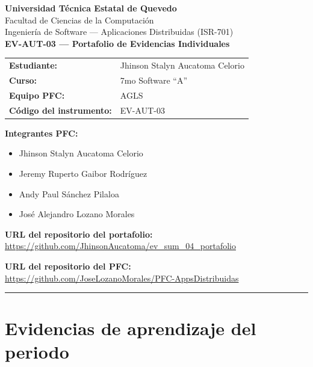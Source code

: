 \documentclass[11pt]{article}
\title{}
\date{}
\begin{document}
    \begin{center}
        {\large\bfseries Universidad Técnica Estatal de Quevedo}\\
        Facultad de Ciencias de la Computación\\
        Ingeniería de Software --- Aplicaciones Distribuidas (ISR-701)\\[1em]
        {\Large\bfseries EV-AUT-03 --- Portafolio de Evidencias Individuales}\\[1.5em]
    \end{center}
    \noindent
    \begin{tabular}{@{}ll}
        \textbf{Estudiante:} & Jhinson Stalyn Aucatoma Celorio \\
        \textbf{Curso:} & 7mo Software ``A'' \\
        \textbf{Equipo PFC:} & AGLS \\
        \textbf{Código del instrumento:} & EV-AUT-03 \\
    \end{tabular}

    \medskip
    \noindent\textbf{Integrantes PFC:}
    \begin{itemize}[noitemsep,topsep=2pt]
          \item Jhinson Stalyn Aucatoma Celorio
          \item Jeremy Ruperto Gaibor Rodríguez
          \item Andy Paul Sánchez Pilaloa
          \item José Alejandro Lozano Morales
    \end{itemize}

    \bigskip
    \noindent\textbf{URL del repositorio del portafolio:}\\
    \url{https://github.com/JhinsonAucatoma/ev_sum_04_portafolio}

    \medskip
    \noindent\textbf{URL del repositorio del PFC:}\\
    \url{https://github.com/JoseLozanoMorales/PFC-AppsDistribuidas}

    \vspace{2em}
    \hrule
    \vspace{2em}

    \section{Evidencias de aprendizaje del periodo}
\end{document}
